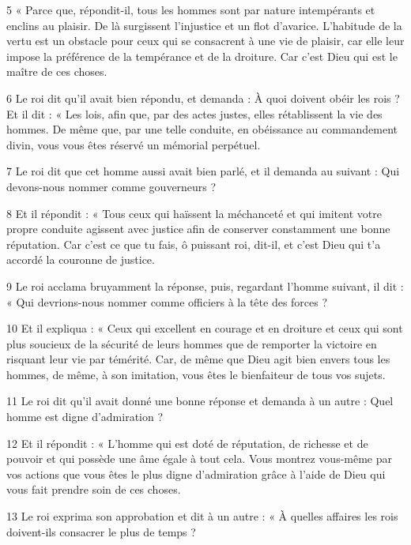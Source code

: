 \par 5 « Parce que, répondit-il, tous les hommes sont par nature intempérants et enclins au plaisir. De là surgissent l’injustice et un flot d’avarice. L'habitude de la vertu est un obstacle pour ceux qui se consacrent à une vie de plaisir, car elle leur impose la préférence de la tempérance et de la droiture. Car c'est Dieu qui est le maître de ces choses.

\par 6 Le roi dit qu'il avait bien répondu, et demanda : À quoi doivent obéir les rois ? Et il dit : « Les lois, afin que, par des actes justes, elles rétablissent la vie des hommes. De même que, par une telle conduite, en obéissance au commandement divin, vous vous êtes réservé un mémorial perpétuel.

\par 7 Le roi dit que cet homme aussi avait bien parlé, et il demanda au suivant : Qui devons-nous nommer comme gouverneurs ?

\par 8 Et il répondit : « Tous ceux qui haïssent la méchanceté et qui imitent votre propre conduite agissent avec justice afin de conserver constamment une bonne réputation. Car c'est ce que tu fais, ô puissant roi, dit-il, et c'est Dieu qui t'a accordé la couronne de justice.

\par 9 Le roi acclama bruyamment la réponse, puis, regardant l'homme suivant, il dit : « Qui devrions-nous nommer comme officiers à la tête des forces ?

\par 10 Et il expliqua : « Ceux qui excellent en courage et en droiture et ceux qui sont plus soucieux de la sécurité de leurs hommes que de remporter la victoire en risquant leur vie par témérité. Car, de même que Dieu agit bien envers tous les hommes, de même, à son imitation, vous êtes le bienfaiteur de tous vos sujets.

\par 11 Le roi dit qu'il avait donné une bonne réponse et demanda à un autre : Quel homme est digne d'admiration ?

\par 12 Et il répondit : « L'homme qui est doté de réputation, de richesse et de pouvoir et qui possède une âme égale à tout cela. Vous montrez vous-même par vos actions que vous êtes le plus digne d'admiration grâce à l'aide de Dieu qui vous fait prendre soin de ces choses.

\par 13 Le roi exprima son approbation et dit à un autre : « À quelles affaires les rois doivent-ils consacrer le plus de temps ?

